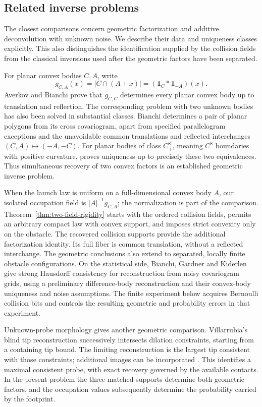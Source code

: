 \subsection{Related inverse problems}
\label{sec:theorem-comparison}
The closest comparisons concern geometric factorization and additive
deconvolution with unknown noise. We describe their data and uniqueness
classes explicitly. This also distinguishes the identification supplied
by the collision fields from the classical inversions used after the
geometric factors have been separated.

For planar convex bodies $C,A$, write
\[
 g_{C,A}(x)=|C\cap(A+x)|
          =(\mathbf1_C*\mathbf1_{-A})(x).
\]
Averkov and Bianchi \cite[Theorem~1.1]{AverkovBianchi} prove that
$g_{C,C}$ determines every planar convex body up to translation and
reflection. The corresponding problem with two unknown bodies has
also been solved in substantial classes. Bianchi
\cite[Theorem~1.1]{BianchiCross} determines a pair of planar polygons
from its cross covariogram, apart from specified parallelogram
exceptions and the unavoidable common translations and reflected
interchanges $(C,A)\mapsto(-A,-C)$. For planar bodies of class
$C^8_+$, meaning $C^8$ boundaries with positive curvature,
\cite[Theorem~6.3]{BianchiLaplace} proves uniqueness up to precisely
these two equivalences. Thus simultaneous recovery of two convex
factors is an established geometric inverse problem.

When the launch law is uniform on a full-dimensional convex body $A$,
our isolated occupation field is $|A|^{-1}g_{C,A}$; the normalization
is part of the comparison. Theorem~\ref{thm:two-field-rigidity} starts
with the ordered collision fields, permits an arbitrary compact law
with convex support, and imposes strict convexity only on the obstacle.
The recovered collision supports provide the additional factorization
identity. Its full fiber is common translation, without a reflected
interchange. The geometric conclusions also extend to separated,
locally finite obstacle configurations. On the statistical side,
Bianchi, Gardner and Kiderlen \cite[Theorems~4.10 and~6.4]{BGK} give
strong Hausdorff consistency for reconstruction from noisy covariogram
grids, using a preliminary difference-body reconstruction and their
convex-body uniqueness and noise assumptions. The finite
experiment below acquires Bernoulli collision bits and controls the
resulting geometric and probability errors in that experiment.

Unknown-probe morphology gives another geometric comparison.
Villarrubia's blind tip reconstruction
\cite[Section~5.1, equations~(14)--(15)]{Villarrubia} successively
intersects dilation constraints, starting from a containing tip bound.
The limiting reconstruction is the largest tip consistent with those
constraints; additional images can be incorporated
\cite[Section~7.3.3]{Villarrubia}. This identifies a maximal consistent
probe, with exact recovery governed by the available contacts.
In the present problem the three matched supports determine both
geometric factors, and the occupation values subsequently determine
the probability carried by the footprint.

